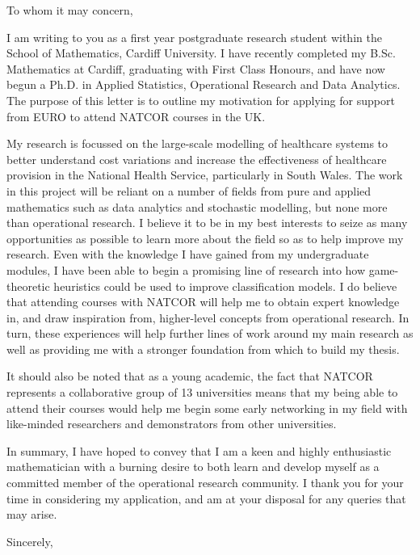 \documentclass[11pt]{letter}
\begin{document}
\signature{Henry Wilde}

\begin{letter}{}

\opening{To whom it may concern,}

I am writing to you as a first year postgraduate research student within the 
School of Mathematics, Cardiff University. I have recently completed my B.Sc. 
Mathematics at Cardiff, graduating with First Class Honours, and have now begun 
a Ph.D. in Applied Statistics, Operational Research and Data Analytics. The 
purpose of this letter is to outline my motivation for applying for support from
EURO to attend NATCOR courses in the UK.

My research is focussed on the large-scale modelling of healthcare systems to 
better understand cost variations and increase the effectiveness of healthcare 
provision in the National Health Service, particularly in South Wales. The work
in this project will be reliant on a number of fields from pure and applied 
mathematics such as data analytics and stochastic modelling, but none more than
operational research. I believe it to be in my best interests to seize as many 
opportunities as possible to learn more about the field so as to help improve my
research. Even with the knowledge I have gained from my undergraduate modules, I
have been able to begin a promising line of research into how game-theoretic 
heuristics could be used to improve classification models. I do believe that 
attending courses with NATCOR will help me to obtain expert knowledge in, and 
draw inspiration from, higher-level concepts from operational research. In turn,
these experiences will help further lines of work around my main research as 
well as providing me with a stronger foundation from which to build my thesis.

It should also be noted that as a young academic, the fact that NATCOR 
represents a collaborative group of 13 universities means that my being able to 
attend their courses would help me begin some early networking in my field with
like-minded researchers and demonstrators from other universities.

In summary, I have hoped to convey that I am a keen and highly enthusiastic
mathematician with a burning desire to both learn and develop myself as a 
committed member of the operational research community. I thank you for your 
time in considering my application, and am at your disposal for any queries that
may arise.


\closing{Sincerely,}

\end{letter}
\end{document}
